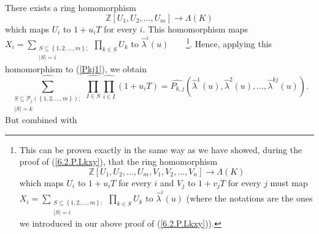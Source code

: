 \documentclass[numbers=enddot,12pt,final,onecolumn,notitlepage]{scrartcl}%
\begin{document}
There exists a ring homomorphism%
\[
\mathbb{Z}\left[  U_{1},U_{2},...,U_{m}\right]  \rightarrow\Lambda\left(
K\right)
\]
which maps $U_{i}$ to $1+u_{i}T$ for every $i$. This homomorphism maps
$X_{i}=\sum\limits_{\substack{S\subseteq\left\{  1,2,...,m\right\}
;\\\left\vert S\right\vert =i}}\prod\limits_{k\in S}U_{k}$ to
$\widehat{\lambda}^{i}\left(  u\right)  $\ \ \ \ \footnote{This can be proven
exactly in the same way as we have showed, during the proof of
(\ref{6.2.P.Lkxy}), that the ring homomorphism
\[
\mathbb{Z}\left[  U_{1},U_{2},...,U_{m},V_{1},V_{2},...,V_{n}\right]
\rightarrow\Lambda\left(  K\right)
\]
which maps $U_{i}$ to $1+u_{i}T$ for every $i$ and $V_{j}$ to $1+v_{j}T$ for
every $j$ must map $X_{i}=\sum\limits_{\substack{S\subseteq\left\{
1,2,...,m\right\}  ;\\\left\vert S\right\vert =i}}\prod\limits_{k\in S}U_{k}$
to $\widehat{\lambda}^{i}\left(  u\right)  $ (where the notations are the ones
we introduced in our above proof of (\ref{6.2.P.Lkxy})).}. Hence, applying
this homomorphism to (\ref{Pkj1}), we obtain%
\[
\widehat{\sum_{\substack{S\subseteq\mathcal{P}_{j}\left(  \left\{
1,2,...,m\right\}  \right)  ;\\\left\vert S\right\vert =k}}}\widehat{\prod
_{I\in S}}\widehat{\prod_{i\in I}}\left(  1+u_{i}T\right)  =\widehat{P_{k,j}%
}\left(  \widehat{\lambda}^{1}\left(  u\right)  ,\widehat{\lambda}^{2}\left(
u\right)  ,...,\widehat{\lambda}^{kj}\left(  u\right)  \right)  .
\]
But combined with%
\end{document}
